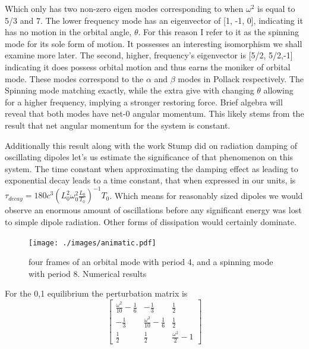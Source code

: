 \documentclass[prbg,preprint]{revtex4-1}
\begin{document}
Which only has two non-zero eigen modes corresponding to when $\omega^2$ is equal to 5/3 and 7. The lower frequency mode has an eigenvector of [1, -1, 0], indicating it has no motion in the orbital angle, $\theta$. For this reason I refer to it as the spinning mode for its sole form of motion. It possesses an interesting isomorphism we shall examine more later. The second, higher, frequency's eigenvector is [5/2, 5/2,-1] indicating it does possess orbital motion and thus earns the moniker of orbital mode. These modes correspond to the $\alpha$ and $\beta$ modes in Pollack\cite{doi:10.1139/p96-151} respectively. The Spinning mode matching exactly, while the extra give with changing $\theta$ allowing for a higher frequency, implying a stronger restoring force. Brief algebra will reveal that both modes have net-0 angular momentum. This likely stems from the result that net angular momentum for the system is constant.

Additionally this result along with the work Stump did on radiation damping of oscillating dipoles \cite{Stump:1997aa} let's us estimate the significance of that phenomenon on this system. The time constant when approximating the damping effect as leading to exponential decay leads to a time constant, that when expressed in our units, is 
$\tau_{decay}=180 c^3 (L_0^2 \omega_0^2\frac{L_0}{T_0})^{-1}T_0$. Which means for reasonably sized dipoles we would observe an enormous amount of oscillations before any significant energy was lost to simple dipole radiation. Other forms of dissipation would certainly dominate.


\begin{figure}[h]
	\texttt{[image: ./images/animatic.pdf]} 

  \caption{four frames of an orbital mode with period 4, and a spinning mode with period 8. Numerical results}
\end{figure}

For the 0,1 equilibrium the perturbation matrix is 
\begin{equation}
	\left[\begin{matrix}\frac{\omega^{2}}{10} - \frac{1}{6} & - \frac{1}{3} & \frac{1}{2}\\
	- \frac{1}{3} & \frac{\omega^{2}}{10} - \frac{1}{6} & \frac{1}{2}\\
	\frac{1}{2} & \frac{1}{2} & \frac{\omega^{2}}{2} - 1\end{matrix}\right]\end{equation}
\end{document}
